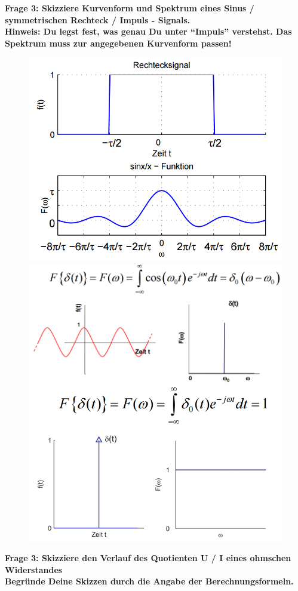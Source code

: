 \documentclass[11pt,a4paper]{scrartcl}
\begin{document}
\textbf{Frage 3: Skizziere Kurvenform und Spektrum eines Sinus / symmetrischen Rechteck / Impuls - Signals.\\
Hinweis: Du legst fest, was genau Du unter "`Impuls"' verstehst. Das Spektrum muss zur angegebenen Kurvenform passen!}\\
\begin{figure}[!htb]
  \includegraphics[width=\linewidth]{rechteck.png}
\endminipage\hfill
{}
  \includegraphics[width=\linewidth]{sinus.png}
\endminipage\hfill
{}
  \includegraphics[width=\linewidth]{impuls.png}
\endminipage
\end{figure}
\textbf{Frage 3: Skizziere den Verlauf des Quotienten U / I eines ohmschen Widerstandes}\\
\textbf{Begründe Deine Skizzen durch die Angabe der Berechnungsformeln.}\\
\end{document}
